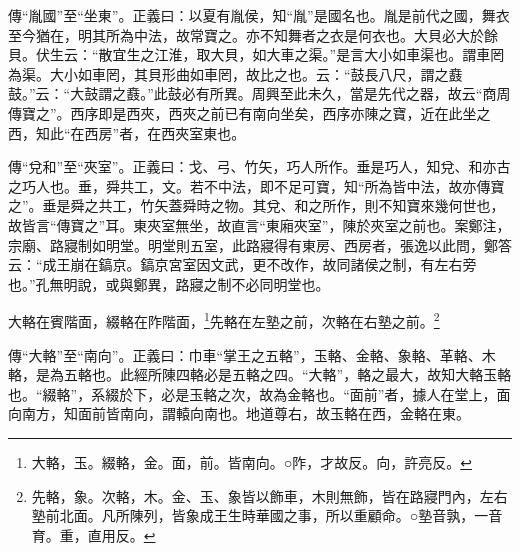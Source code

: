 {\noindent\zhuan{}\fzbyks 傳“胤國”至“坐東”。正義曰：以夏有胤侯，知“胤”是國名也。胤是前代之國，舞衣至今猶在，明其所為中法，故常寶之。亦不知舞者之衣是何衣也。大貝必大於餘貝。伏生云：“散宜生之江淮，取大貝，如大車之渠。”是言大小如車渠也。謂車罔為渠。大小如車罔，其貝形曲如車罔，故比之也。云：“鼓長八尺，謂之鼖鼓。”云：“大鼓謂之鼖。”此鼓必有所異。周興至此未久，當是先代之器，故云“商周傳寶之”。西序即是西夾，西夾之前已有南向坐矣，西序亦陳之寶，近在此坐之西，知此“在西房”者，在西夾室東也。 \par}

{\noindent\zhuan{}\fzbyks 傳“兌和”至“夾室”。正義曰：戈、弓、竹矢，巧人所作。垂是巧人，知兌、和亦古之巧人也。垂，舜共工，文。若不中法，即不足可寶，知“所為皆中法，故亦傳寶之”。垂是舜之共工，竹矢蓋舜時之物。其兌、和之所作，則不知寶來幾何世也，故皆言“傳寶之”耳。東夾室無坐，故直言“東廂夾室”，陳於夾室之前也。案鄭注，宗廟、路寢制如明堂。明堂則五室，此路寢得有東房、西房者，張逸以此問，鄭答云：“成王崩在鎬京。鎬京宮室因文武，更不改作，故同諸侯之制，有左右旁也。”孔無明說，或與鄭異，路寢之制不必同明堂也。 \par}

大輅在賓階面，綴輅在阼階面，\footnote{大輅，玉。綴輅，金。面，前。皆南向。○阼，才故反。向，許亮反。}先輅在左塾之前，次輅在右塾之前。\footnote{先輅，象。次輅，木。金、玉、象皆以飾車，木則無飾，皆在路寢門內，左右塾前北面。凡所陳列，皆象成王生時華國之事，所以重顧命。○塾音孰，一音育。重，直用反。}

{\noindent\zhuan{}\fzbyks 傳“大輅”至“南向”。正義曰：巾車“掌王之五輅”，玉輅、金輅、象輅、革輅、木輅，是為五輅也。此經所陳四輅必是五輅之四。“大輅”，輅之最大，故知大輅玉輅也。“綴輅”，系綴於下，必是玉輅之次，故為金輅也。“面前”者，據人在堂上，面向南方，知面前皆南向，謂轅向南也。地道尊右，故玉輅在西，金輅在東。 \par}

